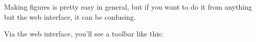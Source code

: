 Making figures is pretty easy in general, but if you want to do it from anything but the web interface, it can be confusing.


Via the web interface, you'll see a toolbar like this: